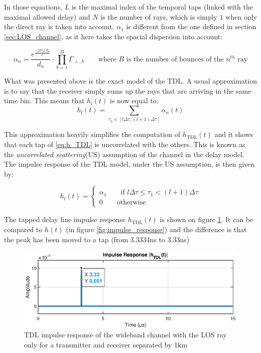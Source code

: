 \documentclass[10pt,a4paper]{ULBreport}
\begin{document}
In those equations, $L$ is the maximal index of the temporal taps (linked with the maximal allowed delay) and $N$ is the number of rays, which is simply $1$ when only the direct ray is taken into account. $\alpha_1$ is different from the one defined in section \ref{sec:LOS_channel}, as it here takes the spacial dispersion into account:

\begin{equation*}
    \alpha_n = \frac{e^{\frac{-j2\pi f_c d_n}{c}}}{d_n} \cdot \prod_{b=1}^{B} \Gamma_{\perp, b} \qquad \text{where } B \text{ is the number of bounces of the } n^{th} \text{ ray}
\end{equation*}

What was presented above is the exact model of the TDL. A usual approximation is to say that the receiver simply sums up the rays that are arriving in the same time bin. This means that $h_l(t)$ is now equal to:
\begin{equation}
    h_l(t) = \sum_{\tau_n \in [l\Delta\tau, (l+1)\Delta\tau]} \alpha_n(t) 
    \label{eq:h_l}
\end{equation}

This approximation heavily simplifies the computation of $h_{\text{TDL}}(t)$ and it shows that each tap of \ref{eq:h_TDL} is uncorrelated with the others. This is known as the \textit{uncorrelated scattering}(US) assumption of the channel in the delay model. \\
The impulse response of the TDL model, under the US assumption, is then given by:

\begin{equation*}
    h_l(t) = \left\{
    \begin{array}{l}
        \alpha_1 \qquad \text{if } l\Delta\tau \leq \tau_1 < (l+1)\Delta\tau\\
        0 \qquad \text{otherwise}
    \end{array}
    \right.
\end{equation*}

The tapped delay line impulse response $h_{\text{TDL}}(t)$ is shown on figure \ref{fig:h_TDL_LOS}. It can be compared to $h(t)$ (in figure \ref{fig:impulse_response}) and the difference is that the peak has been moved to a tap (from 3.3334ns to 3.33ns)

\begin{figure}
    \centering
    \includegraphics[width=1\textwidth]{4_2.eps}
    \caption{TDL impulse response of the wideband channel with the LOS ray only for a transmitter and receiver separated by 1km}
    \label{fig:h_TDL_LOS}
\end{figure}
\end{document}
